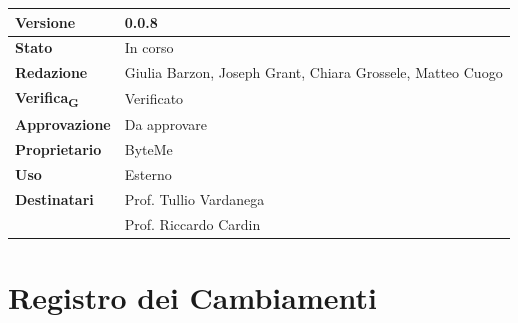 \documentclass[11pt,a4paper]{article}
\newcommand{\gls}[1]{#1\textsubscript{G}}
\begin{document}
\begin{titlepage}
    \begin{table}[H]
        \centering
        \begin{tabular}{|l|p{5cm}|}
            \hline
            \textbf{Versione} & 0.0.8 \\
            \hline
            \textbf{Stato} & In corso \\
            \hline
            \textbf{Redazione} & Giulia Barzon, Joseph Grant, Chiara Grossele, Matteo Cuogo \\
            \hline
            \textbf{\gls{Verifica}} & Verificato \\
            \hline
            \textbf{Approvazione} & Da approvare\\
            \hline
            \textbf{Proprietario} & ByteMe \\
            \hline
            \textbf{Uso} & Esterno \\
            \hline
            \textbf{Destinatari} & Prof. Tullio Vardanega \\ & Prof. Riccardo Cardin \\
            \hline
        \end{tabular}
    \end{table}
    
    \vfill
\end{titlepage}

\thispagestyle{empty}
\section*{Registro dei Cambiamenti}
\end{document}
